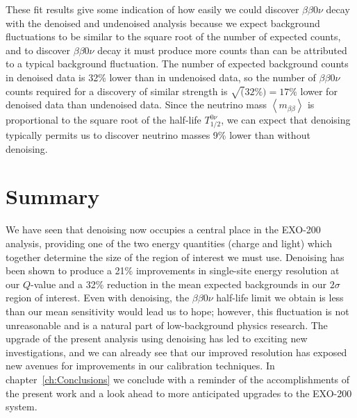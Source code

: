 These fit results give some indication of how easily we could discover $\beta\beta 0\nu$ decay with the denoised and undenoised analysis because we expect background fluctuations to be similar to the square root of the number of expected counts, and to discover $\beta\beta 0\nu$ decay it must produce more counts than can be attributed to a typical background fluctuation.  The number of expected background counts in denoised data is 32\% lower than in undenoised data, so the number of $\beta\beta 0\nu$ counts required for a discovery of similar strength is $\sqrt(32\%) = 17\%$ lower for denoised data than undenoised data.  Since the neutrino mass $\left<m_{\beta\beta}\right>$ is proportional to the square root of the half-life $T_{1/2}^{0\nu}$, we can expect that denoising typically permits us to discover neutrino masses 9\% lower than without denoising.

\section{Summary}\label{sec:ResultSummary}

We have seen that denoising now occupies a central place in the EXO-200 analysis, providing one of the two energy quantities (charge and light) which together determine the size of the region of interest we must use.  Denoising has been shown to produce a 21\% improvements in single-site energy resolution at our $Q$-value and a 32\% reduction in the mean expected backgrounds in our $2\sigma$ region of interest.  Even with denoising, the $\beta\beta 0\nu$ half-life limit we obtain is less than our mean sensitivity would lead us to hope; however, this fluctuation is not unreasonable and is a natural part of low-background physics research.  The upgrade of the present analysis using denoising has led to exciting new investigations, and we can already see that our improved resolution has exposed new avenues for improvements in our calibration techniques.  In chapter~\ref{ch:Conclusions} we conclude with a reminder of the accomplishments of the present work and a look ahead to more anticipated upgrades to the EXO-200 system.
